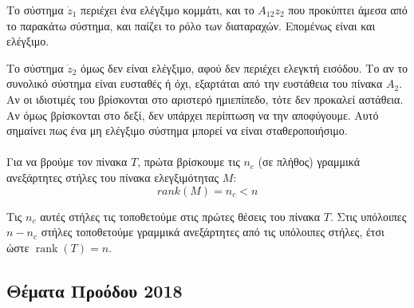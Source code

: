 \documentclass[11pt,a4paper,notitlepage,fleqn]{article}
\let\mytodo\todo
\renewcommand{\todo}[1]{\par\mytodo[inline,noline]{#1}}
\begin{document}
Το σύστημα \( \dot z_1 \) περιέχει ένα ελέγξιμο κομμάτι, και το \( A_{12}z_2 \) που προκύπτει άμεσα από το παρακάτω σύστημα, και παίζει το
ρόλο των διαταραχών. Επομένως είναι και ελέγξιμο.

Το σύστημα \( \dot z_2 \) όμως δεν είναι ελέγξιμο, αφού δεν περιέχει ελεγκτή εισόδου. Το αν το συνολικό σύστημα είναι ευσταθές ή όχι,
εξαρτάται από την ευστάθεια του πίνακα \( A_2 \). Αν οι ιδιοτιμές
του βρίσκονται στο αριστερό ημιεπίπεδο, τότε δεν προκαλεί αστάθεια. Αν όμως
βρίσκονται στο δεξί, δεν υπάρχει περίπτωση να την αποφύγουμε. Αυτό σημαίνει
πως ένα μη ελέγξιμο σύστημα μπορεί να είναι σταθεροποιήσιμο.

\paragraph{}
Για να βρούμε τον πίνακα \( T \), πρώτα βρίσκουμε τις \( n_c \) (σε πλήθος)
γραμμικά ανεξάρτητες στήλες του πίνακα ελεγξιμότητας \( M \):
\[
rank(M) = n_c < n
\]

Τις \( n_c \) αυτές στήλες τις τοποθετούμε στις πρώτες θέσεις του πίνακα
\( T \). Στις υπόλοιπες \( n-n_c \) στήλες τοποθετούμε γραμμικά ανεξάρτητες
από τις υπόλοιπες στήλες, έτσι ώστε \( \mathop{rank}(T) = n \).
\todo{Graph 31}

\subsection{\color{green!50!black!90!blue!50!white}Θέματα Προόδου 2018}
\end{document}
